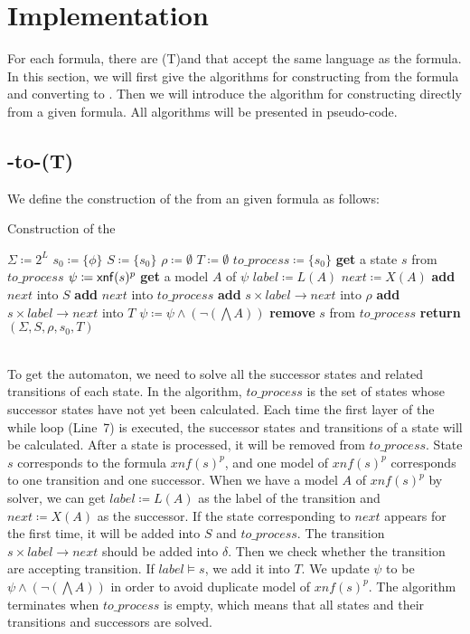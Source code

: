 \section{Implementation}\label{sec:algorithm}
For each \ltlf formula, there are (T)\NFA and \DFA that accept the same language as the formula. In this section, we will first give the algorithms for constructing \TNFA from the \ltlf formula and converting \TNFA to \NFA. Then we will introduce the algorithm for constructing \TDFA directly from a given \ltlf formula. All algorithms will be presented in pseudo-code.

\subsection{\ltlf-to-(T)\NFA}
We define the construction of the \TNFA from an given \ltlf formula as follows: 
~\\
\begin{algorithm}[H] \label{algo:TNFAconstruct}
  \caption{Construction of the \TNFA}
  \LinesNumbered
  $\Sigma\coloneqq 2^L$\;
  $s_0\coloneqq\{\phi\}$\;
  $S\coloneqq\{s_0\}$\;
  $\rho\coloneqq\emptyset$\;
  $T\coloneqq\emptyset$\;
  $to\_process\coloneqq\{s_0\}$\;
  {
    \textbf{get} a state $s$ from $to\_process$\;
    $\psi\coloneqq{\sf xnf}(s)^p$\;
    {
      \textbf{get} a model $A$ of $\psi$\;
      $label\coloneqq L(A)$\;
      $next\coloneqq X(A)$\;
      {
        \textbf{add} $next$ into $S$\;
        \textbf{add} $next$ into $to\_process$\;
      }
       \textbf{add} $s\times label\to next$ into $\rho$\;
      {
        \textbf{add} $s\times label\to next$ into $T$\;
      }
       $\psi\coloneqq \psi\land(\neg(\bigwedge A))$\;
    }
    \textbf{remove} $s$ from $to\_process$\;
  }
  \textbf{return} $(\Sigma,S,\rho,s_0,T)$\;
\end{algorithm}
~\\
To get the automaton, we need to solve all the successor states and related transitions of each state. In the algorithm, $to\_process$ is the set of states whose successor states have not yet been calculated. Each time the first layer of the while loop (Line~7) is executed, the successor states and transitions of a state will be calculated. After a state is processed, it will be removed from $to\_process$. State $s$ corresponds to the formula $xnf(s)^p$, and one model of $xnf(s)^p$ corresponds to one transition and one successor. When we have a model $A$ of $xnf(s)^p$ by \SAT solver, we can get $label\coloneqq L(A)$ as the label of the transition and $next\coloneqq X(A)$ as the successor. If the state corresponding to $next$ appears for the first time, it will be added into $S$ and $to\_process$. The transition $s\times label\to next$ should be added into $\delta$. Then we check whether the transition are accepting transition. If $label\models s$, we add it into $T$. We update $\psi$ to be $\psi\land(\neg(\bigwedge A))$ in order to avoid duplicate model of $xnf(s)^p$. The algorithm terminates when $to\_process$ is empty, which means that all states and their transitions and successors are solved.

